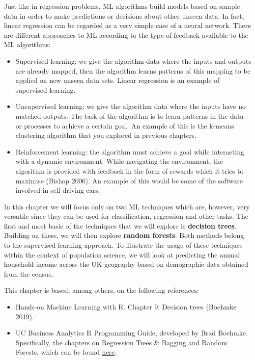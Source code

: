 \documentclass[
  letterpaper,
  DIV=11,
  numbers=noendperiod]{scrreprt}
\begin{document}
Just like in regression problems, ML algorithms build models based on
sample data in order to make predictions or decisions about other unseen
data. In fact, linear regression can be regarded as a very simple case
of a neural network. There are different approaches to ML according to
the type of feedback available to the ML algorithms:

\begin{itemize}
\item
  Supervised learning: we give the algorithm data where the inputs and
  outputs are already mapped, then the algorithm learns patterns of this
  mapping to be applied on new unseen data sets. Linear regression is an
  example of supervised learning.
\item
  Unsupervised learning: we give the algorithm data where the inputs
  have no matched outputs. The task of the algorithm is to learn
  patterns in the data or processes to achieve a certain goal. An
  example of this is the k-means clustering algorithm that you explored
  in previous chapters.
\item
  Reinforcement learning: the algorithm must achieve a goal while
  interacting with a dynamic environment. While navigating the
  environment, the algorithm is provided with feedback in the form of
  rewards which it tries to maximise (Bishop 2006). An example of this
  would be some of the software involved in self-driving cars.
\end{itemize}

In this chapter we will focus only on two ML techniques which are,
however, very versatile since they can be used for classification,
regression and other tasks. The first and most basic of the techniques
that we will explore is \textbf{decision trees}. Building on these, we
will then explore \textbf{random forests}. Both methods belong to the
supervised learning approach. To illustrate the usage of these
techniques within the context of population science, we will look at
predicting the annual household income across the UK geography based on
demographic data obtained from the census.

This chapter is based, among others, on the following references:

\begin{itemize}
\item
  Hands-on Machine Learning with R. Chapter 9: Decision trees (Boehmke
  2019).
\item
  UC Business Analytics R Programming Guide, developed by Brad Boehmke.
  Specifically, the chapters on Regression Trees \& Bagging and Random
  Forests, which can be found
  \href{http://uc-r.github.io/predictive}{here}.
\end{itemize}
\end{document}
